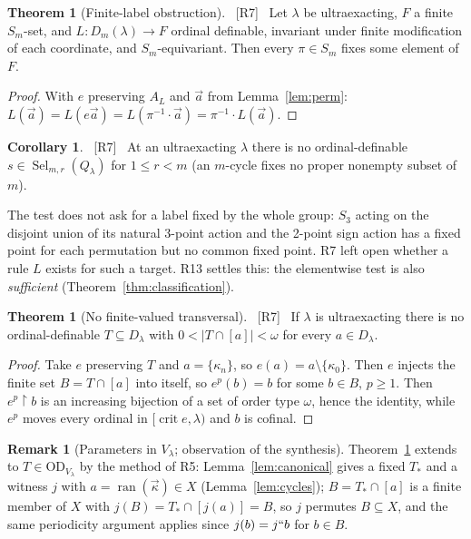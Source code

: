 \documentclass[11pt,letterpaper]{article}
\theoremstyle{definition}
\newtheorem{theorem}[definition]{Theorem}
\newtheorem{corollary}[definition]{Corollary}
\newtheorem{remark}[definition]{Remark}
\numberwithin{equation}{section}
\newcommand{\OD}{\mathrm{OD}}
\newcommand{\crit}{\operatorname{crit}}
\newcommand{\ran}{\operatorname{ran}}
\newcommand{\restr}{\mathbin{\upharpoonright}}
\newcommand{\Sel}{\operatorname{Sel}}
\newcommand{\src}[1]{\unskip\ {\normalfont\small\sffamily\color{Olive}[#1]}\ }
\newcommand{\R}[1]{\textsf{R#1}}
\begin{document}
\begin{theorem}[Finite-label obstruction]\label{thm:label}\src{R7}
Let $\lambda$ be ultraexacting, $F$ a finite $S_m$-set, and $L:D_m(\lambda)\to F$ ordinal definable, invariant under finite modification of each coordinate, and $S_m$-equivariant. Then every $\pi\in S_m$ fixes some element of $F$.
\end{theorem}

\begin{proof}
With $e$ preserving $A_L$ and $\vec a$ from Lemma~\ref{lem:perm}: $L(\vec a)=L(e\vec a)=L(\pi^{-1}\cdot\vec a)=\pi^{-1}\cdot L(\vec a)$.
\end{proof}

\begin{corollary}\label{cor:label-sel}\src{R7}
At an ultraexacting $\lambda$ there is no ordinal-definable $s\in\Sel_{m,r}(Q_\lambda)$ for $1\le r<m$ (an $m$-cycle fixes no proper nonempty subset of $m$).
\end{corollary}

The test does not ask for a label fixed by the whole group: $S_3$ acting on the disjoint union of its natural 3-point action and the 2-point sign action has a fixed point for each permutation but no common fixed point. \R7 left open whether a rule $L$ exists for such a target. \R{13} settles this: the elementwise test is also \emph{sufficient} (Theorem~\ref{thm:classification}).

\begin{theorem}[No finite-valued transversal]\label{thm:transversal}\src{R7}
If $\lambda$ is ultraexacting there is no ordinal-definable $T\subseteq D_\lambda$ with $0<|T\cap[a]|<\omega$ for every $a\in D_\lambda$.
\end{theorem}

\begin{proof}
Take $e$ preserving $T$ and $a=\{\kappa_n\}$, so $e(a)=a\setminus\{\kappa_0\}$. Then $e$ injects the finite set $B=T\cap[a]$ into itself, so $e^p(b)=b$ for some $b\in B$, $p\ge1$. Then $e^p\restr b$ is an increasing bijection of a set of order type $\omega$, hence the identity, while $e^p$ moves every ordinal in $[\crit e,\lambda)$ and $b$ is cofinal.
\end{proof}

\begin{remark}[Parameters in $V_\lambda$; observation of the synthesis]
Theorem~\ref{thm:transversal} extends to $T\in\OD_{V_\lambda}$ by the method of \R5: Lemma~\ref{lem:canonical} gives a fixed $T_*$ and a witness $j$ with $a=\ran(\vec\kappa)\in X$ (Lemma~\ref{lem:cycles}); $B=T_*\cap[a]$ is a finite member of $X$ with $j(B)=T_*\cap[j(a)]=B$, so $j$ permutes $B\subseteq X$, and the same periodicity argument applies since $j(b)=j``b$ for $b\in B$.
\end{remark}
\end{document}
